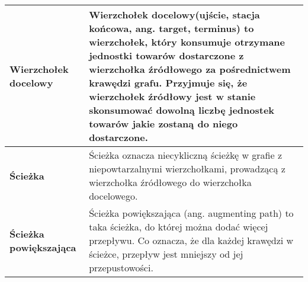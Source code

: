 \documentclass[10pt]{minutes}
\begin{document}
\begin{longtable}{>{\bfseries}p{} p{}}
    \midrule
    Wierzchołek docelowy &
    Wierzchołek docelowy(ujście, stacja końcowa, ang. target, terminus) to wierzchołek, który konsumuje otrzymane jednostki towarów dostarczone z wierzchołka 
    źródłowego za pośrednictwem krawędzi grafu. Przyjmuje się, że wierzchołek źródłowy jest w stanie skonsumować dowolną liczbę jednostek towarów jakie zostaną
    do niego dostarczone.\\
    \midrule
    Ścieżka &
    Ścieżka oznacza niecykliczną ścieżkę w grafie z niepowtarzalnymi wierzchołkami, prowadzącą z wierzchołka źródłowego do wierzchołka docelowego.\\
    \midrule
    Ścieżka powiększająca &
    Ścieżka powiększająca (ang. augmenting path) to taka ścieżka, do której można dodać więcej przepływu. Co oznacza, że dla każdej krawędzi w ścieżce, 
    przepływ jest mniejszy od jej przepustowości.\\
    \bottomrule
  \end{longtable}
\end{document}
